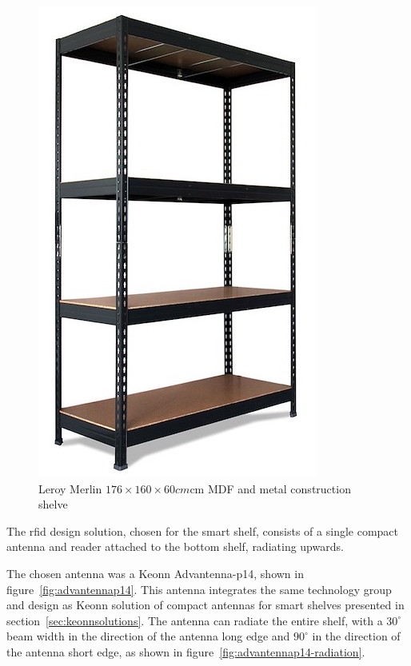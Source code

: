 \begin{figure}
    \centering
    \includegraphics[width=0.4\linewidth]{./figs/estantedemetal.jpg}
    \caption[Leroy Merlin $176\times160\times60cm$cm MDF and metal construction shelve]{Leroy Merlin $176\times160\times60cm$cm MDF and metal construction shelve~\cite{EstanteMetalStabil}} 
    \label{fig:commercialshelve}
\end{figure}

The \ac{rfid} design solution, chosen for the smart shelf, consists of a single compact antenna and reader attached to the bottom shelf, radiating upwards.

The chosen antenna was a Keonn Advantenna-p14, shown in figure~\ref{fig:advantennap14}. This antenna integrates the same technology group and design as Keonn solution of compact antennas for smart shelves presented in section~\ref{sec:keonnsolutions}.
The antenna can radiate the entire shelf, with a $30^{\circ}$ beam width in the direction of the antenna long edge and $90^{\circ}$ in the direction of the antenna short edge, as shown in figure~\ref{fig:advantennap14-radiation}.


